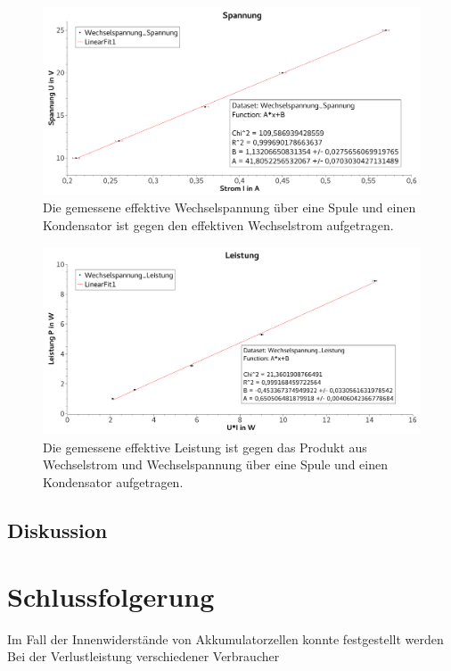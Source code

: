 \documentclass[
	a4paper,
	12pt,
	pagesize,
	ngerman
]{scrartcl}
\begin{document}
	\begin{figure}[tb]
		\includegraphics[width=1\textwidth]{KondensatorSpannungWechsel}
		\centering
		\caption{Die gemessene effektive Wechselspannung über eine Spule und einen Kondensator ist gegen den effektiven Wechselstrom aufgetragen.}
		\label{KondensatorSpannungWechsel}
		\centering
	\end{figure}
	\begin{figure}[tb]
		\includegraphics[width=1\textwidth]{KondensatorLeistungWechsel}
		\centering
		\caption{Die gemessene effektive Leistung ist gegen das Produkt aus Wechselstrom und Wechselspannung über eine Spule und einen Kondensator aufgetragen.}
		\label{KondensatorLeistungWechsel}
		\centering
	\end{figure}
	



	




	\subsection{Diskussion}
	
	\section{Schlussfolgerung}
	Im Fall der Innenwiderstände von Akkumulatorzellen konnte festgestellt werden
	Bei der Verlustleistung verschiedener Verbraucher 
\end{document}
